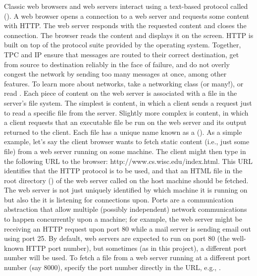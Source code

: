 {}Classic web browsers and web servers interact using a text-based protocol called  (). A web browser opens a connection to a web server and requests some content with HTTP. The web server responds with the requested content and closes the connection. The browser reads the content and displays it on the screen.\markdownRendererInterblockSeparator
{}HTTP is built on top of the  protocol suite provided by the operating system. Together, TPC and IP ensure that messages are routed to their correct destination, get from source to destination reliably in the face of failure, and do not overly congest the network by sending too many messages at once, among other features. To learn more about networks, take a networking class (or many!), or read .\markdownRendererInterblockSeparator
{}Each piece of content on the web server is associated with a file in the server's file system. The simplest is  content, in which a client sends a request just to read a specific file from the server. Slightly more complex is  content, in which a client requests that an executable file be run on the web server and its output returned to the client. Each file has a unique name known as a  (). \markdownRendererInterblockSeparator
{}As a simple example, let's say the client browser wants to fetch static content (i.e., just some file) from a web server running on some machine. The client might then type in the following URL to the browser: http://www.cs.wisc.edu/index.html. This URL identifies that the HTTP protocol is to be used, and that an HTML file in the root directory (\markdownRendererCodeSpan{/}) of the web server called  on the host machine  should be fetched.\markdownRendererInterblockSeparator
{}The web server is not just uniquely identified by which machine it is running on but also the  it is listening for connections upon. Ports are a communication abstraction that allow multiple (possibly independent) network communications to happen concurrently upon a machine; for example, the web server might be receiving an HTTP request upon port 80 while a mail server is sending email out using port 25. By default, web servers are expected to run on port 80 (the well-known HTTP port number), but sometimes (as in this project), a different port number will be used. To fetch a file from a web server running at a different port number (say 8000), specify the port number directly in the URL, e.g., .\markdownRendererInterblockSeparator

